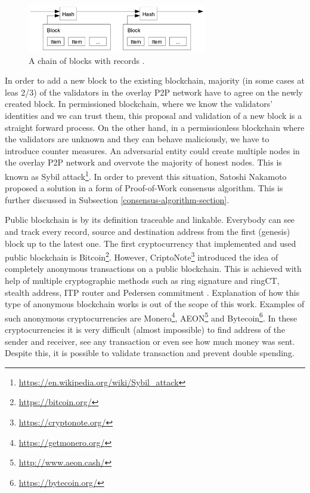 \begin{figure}[ht]
	\centering
	\includegraphics[width=0.7\textwidth]{images/blockchain-satoshi.png}
	\caption{\label{fig:satoshi-blockchain}A chain of blocks with records \cite{nakamoto_bitcoin:_2008}.}
\end{figure}

In order to add a new block to the existing blockchain, majority (in some cases at leas 2/3) of the validators in the overlay P2P network have to agree on the newly created block. In permissioned blockchain, where we know the validators' identities and we can trust them, this proposal and validation of a new block is a straight forward process. On the other hand, in a permissionless blockchain where the validators are unknown and they can behave maliciously, we have to introduce counter measures. An adversarial entity could create multiple nodes in the overlay P2P network and overvote the majority of honest nodes. This is known as Sybil attack\footnote{\url{https://en.wikipedia.org/wiki/Sybil_attack}}. In order to prevent this situation, Satoshi Nakamoto proposed a solution in a form of Proof-of-Work consensus algorithm. This is further discussed in Subsection \ref{consensus-algorithm-section}.

Public blockchain is by its definition traceable and linkable. Everybody can see and track every record, source and destination address from the first (genesis) block up to the latest one. The first cryptocurrency that implemented and used public blockchain is Bitcoin\footnote{\url{https://bitcoin.org/}}. However, CriptoNote\footnote{\url{https://cryptonote.org/}} introduced the idea of completely anonymous transactions on a public blockchain. This is achieved with help of multiple cryptographic methods such as ring signature and ringCT, stealth address, ITP router and Pedersen commitment \cite{noether_ring_2015}. Explanation of how this type of anonymous blockchain works is out of the scope of this work. Examples of such anonymous cryptocurrencies are Monero\footnote{\url{https://getmonero.org/}}, AEON\footnote{\url{http://www.aeon.cash/}} and Bytecoin\footnote{\url{https://bytecoin.org/}}. In these cryptocurrencies it is very difficult (almost impossible) to find address of the sender and receiver, see any transaction or even see how much money was sent. Despite this, it is possible to validate transaction and prevent double spending.

